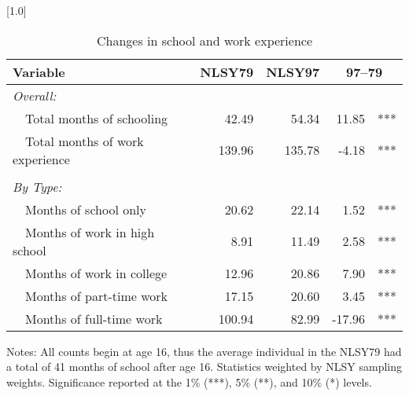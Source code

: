 \begin{table}[ht]
\caption{Changes in school and work experience}\label{tab:exp}
\centering
\scalebox{1.0}[1.0]{%
\begin{threeparttable}
\begin{tabular}{lrrr@{}l}
\toprule 
Variable & NLSY79 & NLSY97 & \multicolumn{2}{c}{97--79} \\
\midrule 
\multicolumn{5}{l}{\emph{Overall:}}                                               \\
~~Total months of schooling        & 42.49 & 54.34 & 11.85 & *** \\
~~Total months of work experience  & 139.96 & 135.78 & -4.18 & *** \\
\vspace{-6pt}                                                                         \\ 
\multicolumn{5}{l}{\emph{By Type:}}                                               \\
~~Months of school only            & 20.62 & 22.14 & 1.52 & *** \\
~~Months of work in high school    & 8.91 & 11.49 & 2.58 & *** \\
~~Months of work in college        & 12.96 & 20.86 & 7.90 & *** \\
~~Months of part-time work         & 17.15 & 20.60 & 3.45 & *** \\
~~Months of full-time work         & 100.94 & 82.99 & -17.96 & *** \\
\bottomrule 
\end{tabular} 
\footnotesize{Notes: All counts begin at age 16, thus the average individual in the NLSY79 had a total of 41 months of school after age 16. Statistics weighted by NLSY sampling weights. Significance reported at the 1\% (***), 5\% (**), and 10\% (*) levels.}
\end{threeparttable} 
} 
\end{table} 
